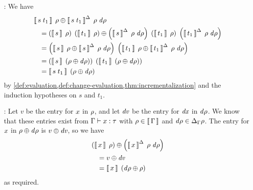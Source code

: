 \begin{optionalproof}
  \Case {}: We have
  \begin{align*}
    &         \Apply
                {\EvalIncWith{\App{s}{t_1}}{\Gr}{\D \Gr}}
                {\EvalWith{\App{s}{t_1}}{\Gr}}\\
    & \quad = \Apply
                {\App
                  {\App
                    {\EvalIncWith*{s}{\rho}{\D \rho}}
                    {\EvalWith*{t_1}{\rho}}}
                  {\EvalIncWith*{t_1}{\rho}{\D \rho}}}
                {\App
                  {\EvalWith*{s}{\Gr}}
                  {\EvalWith*{t_1}{\Gr}}}\\
    & \quad = \App
                {\Apply*
                  {\EvalIncWith{s}{\Gr}{\D \Gr}}
                  {\EvalWith{s}{\Gr}}}
                {\Apply*
                  {\EvalIncWith{t_1}{\Gr}{\D \Gr}}
                  {\EvalWith{t_1}{\Gr}}}\\
    & \quad = \App
                {\EvalWith*{s}{\Apply*{\D \Gr}{\Gr}}}
                {\EvalWith*{t_1}{\Apply*{\D \Gr}{\Gr}}}\\
    & \quad = \EvalWith
                {\App{s}{t_1}}
                {\Apply*{\D \Gr}{\Gr}}
  \end{align*}
  by
  \cref{def:evaluation,def:change-evaluation,thm:incrementalization}
  and the induction hypotheses on $s$ and $t_1$.

  \Case {}: Let $v$ be the entry for $\Var{x}$ in $\rho$, and
  let $\mathit{dv}$ be the entry for $\Var{\D x}$ in $\mathit{d\rho}$. We know that
  these entries exist from $\Typing{\Var{x}}{\Gt}$ with $\Gr \in
  \Eval{\GG}$ and $\D \Gr \in \Change[\GG]{\Gr}$. The entry for
  $\Var{x}$ in $\Apply{\D \Gr}{\Gr}$ is $\Apply{\D v}{v}$, so we
  have
  \begin{align*}
    &         \Apply
                {\EvalIncWith*{\Var{x}}{\Gr}{\D \Gr}}
                {\EvalWith*{\Var{x}}{\Gr}}\\
    & \quad = \Apply{\D v}{v}\\
    & \quad = \EvalWith{\Var{x}}{\Apply*{\Gr}{\D \Gr}}
  \end{align*}
  as required.


\end{optionalproof}
